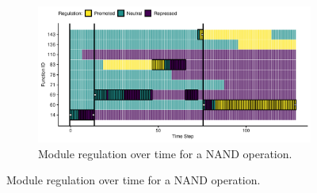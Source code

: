 
\begin{figure}
\centering

\begin{subfigure}[b]{0.75\textwidth}
    \centering
    \includegraphics[width=\textwidth]{chapters/05-tag-based-genetic-regulation/media/boolean-calc-prefix-networks/case-study-trace-id-24400-test_id-420-regulator-state-horizontal.pdf}
    \caption{\small  Module regulation over time for a NAND operation.}
    \label{chapter:tag-based-regulation:subfig:bc-nand-exec-trace}
\end{subfigure}%


\end{figure}
